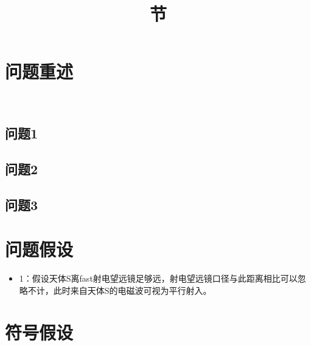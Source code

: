\documentclass[withoutpreface,bwprint]{cumcmthesis} %
\title{节}
\begin{document}
        \maketitle
        \begin{abstract}
  


        \end{abstract}


        \section{问题重述}



        \
    
		\subsection{问题1}

        
        
        
        \subsection{问题2}

       
        
        \subsection{问题3} 
       








        \section{问题假设}
        \begin{itemize}
            \item  1：假设天体S离fast射电望远镜足够远，射电望远镜口径与此距离相比可以忽略不计，此时来自天体S的电磁波可视为平行射入。

        \end{itemize}
        

        
        \section{符号假设}
\end{document}
